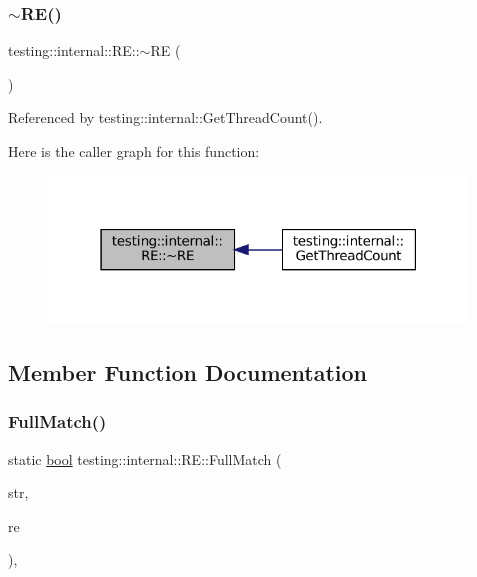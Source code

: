 \subsubsection{\texorpdfstring{$\sim$\+R\+E()}{~RE()}}
{\footnotesize\ttfamily testing\+::internal\+::\+R\+E\+::$\sim$\+RE (\begin{DoxyParamCaption}{ }\end{DoxyParamCaption})}



Referenced by testing\+::internal\+::\+Get\+Thread\+Count().

Here is the caller graph for this function\+:
\nopagebreak
\begin{figure}[H]
\begin{center}
\leavevmode
\includegraphics[width=316pt]{classtesting_1_1internal_1_1RE_af3ad18e6c0b433f3d85ed23eda8119f3_icgraph}
\end{center}
\end{figure}


\subsection{Member Function Documentation}
\mbox{\label{classtesting_1_1internal_1_1RE_aa79a950758d0f1d62f7762d1e9cefe86}} 
\subsubsection{\texorpdfstring{Full\+Match()}{FullMatch()}\hspace{0.1cm}{\footnotesize\ttfamily [1/2]}}
{\footnotesize\ttfamily static \hyperlink{classbool}{bool} testing\+::internal\+::\+R\+E\+::\+Full\+Match (\begin{DoxyParamCaption}\item[{const \+::std\+::string \&}]{str,  }\item[{const \hyperlink{classtesting_1_1internal_1_1RE}{RE} \&}]{re }\end{DoxyParamCaption})\hspace{0.3cm}{\ttfamily [inline]}, {\ttfamily [static]}}



